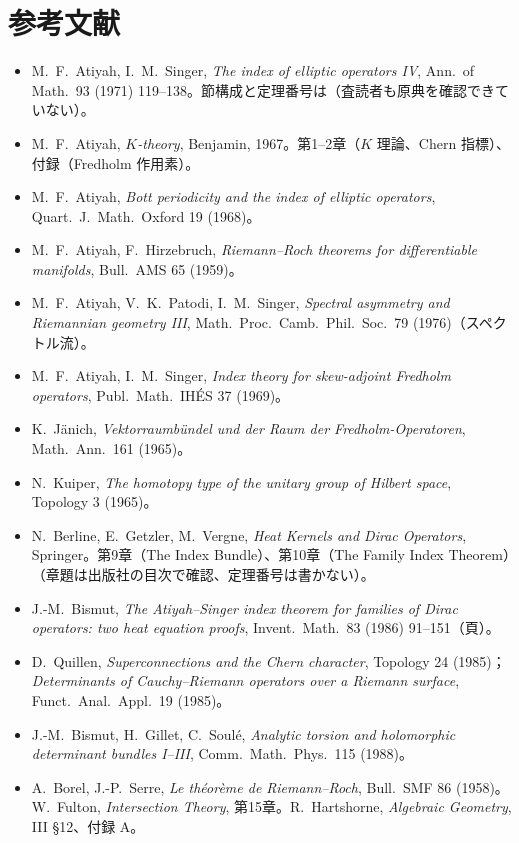 \section*{参考文献}
\begin{itemize}
\item M.~F.~Atiyah, I.~M.~Singer, \emph{The index of elliptic operators IV}, Ann.\ of Math.\ 93 (1971) 119--138。節構成と定理番号は\tQ（査読者も原典を確認できていない）。
\item M.~F.~Atiyah, \emph{$K$-theory}, Benjamin, 1967。第1--2章（$K$ 理論、Chern 指標）、付録（Fredholm 作用素）。
\item M.~F.~Atiyah, \emph{Bott periodicity and the index of elliptic operators}, Quart.\ J.\ Math.\ Oxford 19 (1968)。
\item M.~F.~Atiyah, F.~Hirzebruch, \emph{Riemann--Roch theorems for differentiable manifolds}, Bull.\ AMS 65 (1959)。
\item M.~F.~Atiyah, V.~K.~Patodi, I.~M.~Singer, \emph{Spectral asymmetry and Riemannian geometry III}, Math.\ Proc.\ Camb.\ Phil.\ Soc.\ 79 (1976)（スペクトル流）。
\item M.~F.~Atiyah, I.~M.~Singer, \emph{Index theory for skew-adjoint Fredholm operators}, Publ.\ Math.\ IH\'ES 37 (1969)。
\item K.~J\"anich, \emph{Vektorraumb\"undel und der Raum der Fredholm-Operatoren}, Math.\ Ann.\ 161 (1965)。
\item N.~Kuiper, \emph{The homotopy type of the unitary group of Hilbert space}, Topology 3 (1965)。
\item N.~Berline, E.~Getzler, M.~Vergne, \emph{Heat Kernels and Dirac Operators}, Springer。第9章（The Index Bundle）、第10章（The Family Index Theorem）（章題は出版社の目次で確認、定理番号は書かない）。
\item J.-M.~Bismut, \emph{The Atiyah--Singer index theorem for families of Dirac operators: two heat equation proofs}, Invent.\ Math.\ 83 (1986) 91--151\tQ{}（頁）。
\item D.~Quillen, \emph{Superconnections and the Chern character}, Topology 24 (1985)；\emph{Determinants of Cauchy--Riemann operators over a Riemann surface}, Funct.\ Anal.\ Appl.\ 19 (1985)。
\item J.-M.~Bismut, H.~Gillet, C.~Soul\'e, \emph{Analytic torsion and holomorphic determinant bundles I--III}, Comm.\ Math.\ Phys.\ 115 (1988)。
\item A.~Borel, J.-P.~Serre, \emph{Le th\'eor\`eme de Riemann--Roch}, Bull.\ SMF 86 (1958)。W.~Fulton, \emph{Intersection Theory}, 第15章。R.~Hartshorne, \emph{Algebraic Geometry}, III \S12、付録 A。

\end{itemize}
